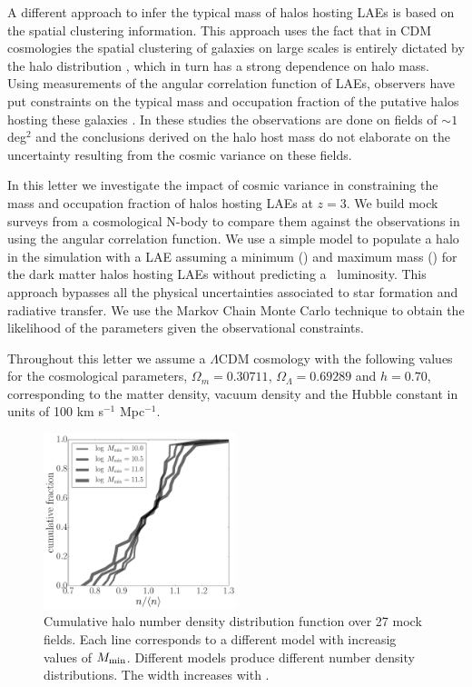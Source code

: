 \documentclass{emulateapj}
\newcommand{\ly}{{\ifmmode{{\rm Ly}\alpha}\else{Ly$\alpha$}\fi}}
\newcommand{\mmin}{{\ifmmode{{M_{\rm min}}}\else{${M_{\rm min}}$}\fi}}
\newcommand{\mmax}{{\ifmmode{{M_{\rm max}}}\else{${M_{\rm max}}$}\fi}}
\begin{document}
A different approach to infer the typical mass of halos hosting
LAEs is based on the spatial clustering information. 
This approach uses the fact
that in CDM cosmologies the spatial clustering of galaxies on large
scales is entirely dictated by the halo distribution
\citep{Colberg00}, which in turn has a strong dependence on halo
mass. 
Using measurements of the angular correlation function of LAEs,
observers have put constraints on the typical mass and occupation
fraction of the putative halos hosting these galaxies
\citep{Hayashino2004,Gawiser07,Nilsson2007,Ouchi2010,Bielby16}. 
In these studies the observations are done on fields of $\sim 1$ deg$^{2}$ and
the conclusions derived on the halo host mass do not elaborate on the uncertainty resulting from the cosmic variance on these fields.

In this letter we investigate the impact of cosmic variance in
constraining the mass and occupation fraction of halos hosting LAEs at $z=3$.
We build mock surveys from a cosmological N-body to compare them against the observations in \cite{Bielby16} using the angular correlation function. 
We use a simple model to populate a halo in the simulation with a LAE   
assuming a minimum (\mmin) and maximum mass (\mmax) for the dark matter halos hosting LAEs without predicting a \ly\  luminosity. 
This approach bypasses all the physical uncertainties associated to star formation and radiative transfer.
We use the Markov Chain Monte Carlo technique to obtain the likelihood of the parameters given the observational constraints.

Throughout this letter we assume a $\Lambda$CDM cosmology with the
following values for the cosmological parameters, $\Omega_{m}=0.30711$,
$\Omega_{\Lambda}=0.69289$ and $h=0.70$, corresponding to the matter
density, vacuum density and the Hubble constant in units of 100 km
s$^{-1}$ Mpc$^{-1}$. 


\begin{figure}
\includegraphics[width=0.50\textwidth]{fig1.pdf}
\caption{Cumulative halo number density distribution function over
  27 mock fields. Each line corresponds to a
  different model with increasig values of $M_{\rm min}$. 
  Different models produce different number density distributions. The
width increases with \mmin.} 
\label{fig:cosmicv0}
\end{figure}
\end{document}
